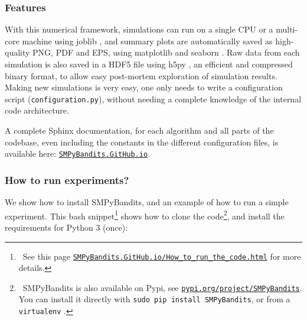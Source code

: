 \begin{small}
    \inputminted[linenos=true,numbersep=5pt,frame=lines,framesep=2mm]{python3}{2-Chapters/3-Chapter/src/example_of_a_IndexPolicy_UCB.py}
\end{small}


\subsubsection{Features}

With this numerical framework, simulations can run on a single CPU or a multi-core machine using joblib \cite{joblib},
and summary plots are automatically saved as high-quality PNG, PDF and EPS, using matplotlib \cite{matplotlib} and seaborn \cite{seaborn}.
Raw data from each simulation is also saved in a HDF5 file using h5py \cite{h5py}, an efficient and compressed binary format, to allow easy post-mortem exploration of simulation results.
Making new simulations is very easy, one only needs to write a configuration script (\texttt{configuration.py}), without needing a complete knowledge of the internal code architecture.

A complete Sphinx documentation, for each algorithm and all parts of the codebase, even including the constants in the different configuration files, is available here: \texttt{\href{https://SMPyBandits.GitHub.io}{SMPyBandits.GitHub.io}}.


\subsubsection{How to run experiments?}

We show how to install SMPyBandits, and an example of how to run a simple experiment.
This bash snippet\footnote{~See this page \texttt{\href{https://SMPyBandits.GitHub.io/How_to_run_the_code.html}{SMPyBandits.GitHub.io/How\_to\_run\_the\_code.html}} for more details.} shows how to clone the code\footnote{~SMPyBandits is also available on Pypi, see \texttt{\href{https://pypi.org/project/SMPyBandits/}{pypi.org/project/SMPyBandits}}. You can install it directly with \texttt{sudo pip install SMPyBandits}, or from a \texttt{virtualenv} \cite{virtualenv}.},
and install the requirements for Python 3 (once):

